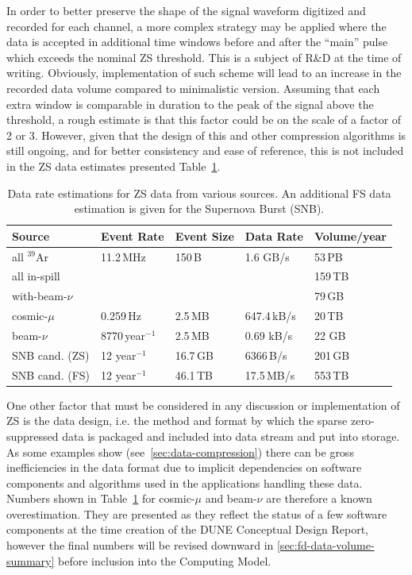 In order to better preserve the shape of the signal waveform digitized and recorded for
each channel, a more complex strategy may be applied where the data is accepted in additional
time windows before and after the ``main'' pulse which exceeds the nominal ZS threshold. This
is a subject of R\&D at the time of writing. Obviously, implementation of such scheme will lead
to an increase in the recorded data volume compared to minimalistic version. Assuming that
each extra window is comparable in duration to the peak of the signal above the threshold,
a rough estimate is that this factor could be on the scale of a factor of 2 or 3. However, given
that the design of this and other compression algorithms is still ongoing, and for better consistency
and ease of reference, this is not included in the ZS data estimates presented Table~\ref{tab:zs-volume}.
	
\begin{table}[ht!]
\centering
\begin{tabular}{| p{1.2in} | p{0.9in} | p{0.75in} | p{0.8in} | p{0.9in} |}		\hline		
Source & Event Rate & Event Size & Data Rate & Volume/year \\ \hline
all $^{39}$Ar & 11.2\,MHz & 150\,B & 1.6 GB/s &  53\,PB \\ \hline
all in-spill & & & & 159\,TB \\ \hline
with-beam-$\nu$ & & & & 79\,GB \\ \hline
cosmic-$\mu$ & 0.259\,Hz &2.5\,MB & 647.4\,kB/s & 20\,TB \\	\hline
beam-$\nu$ & 8770\,year$^{-1}$ & 2.5\,MB & 0.69 kB/s & 22 GB \\ \hline
SNB cand. (ZS) & 12 year$^{-1}$ & 16.7\,GB & 6366\,B/s & 201\,GB \\ \hline
SNB cand. (FS) & 12 year$^{-1}$ & 46.1\,TB & 17.5\,MB/s & 553\,TB \\ \hline
\end{tabular}
\caption{Data rate estimations for ZS data from various sources.
An additional FS data estimation is given for the Supernova Burst (SNB).}
\label{tab:zs-volume}
\end{table}

One other factor that must be considered in any discussion or implementation of ZS is the data design,
i.e. the method and format by which the sparse zero-suppressed data is packaged and included into
data stream and put into storage. As some examples show (see~\ref{sec:data-compression})
there can be gross inefficiencies in the data format due to implicit dependencies
on software components and algorithms used in the applications handling these data.
Numbers shown in Table~\ref{tab:zs-volume} for cosmic-$\mu$ and beam-$\nu$
are therefore a known overestimation. They are presented as they reflect the status
of a few software components at the time creation of the DUNE Conceptual Design Report,
however the final numbers will be revised downward in \ref{sec:fd-data-volume-summary}
before inclusion into the Computing Model.

